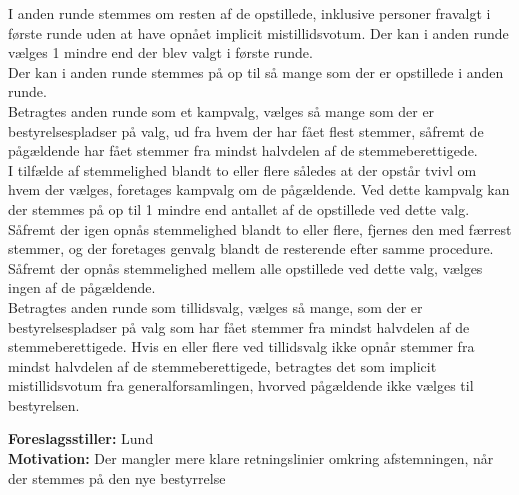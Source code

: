 \documentclass[a4paper,12pt,danish]{article}
\newcommand\who[1]{
    \textbf{Foreslagsstiller:} #1\\
}
\newcommand\why[1]{
    \textbf{Motivation:} #1\\
}
\begin{document}
{{{            I anden runde stemmes om resten af de opstillede, inklusive personer fravalgt i første runde uden at have opnået implicit mistillidsvotum. Der kan i anden runde vælges 1 mindre end der blev valgt i første runde.\\
            Der kan i anden runde stemmes på op til så mange som der er opstillede i anden runde.\\
            Betragtes anden runde som et kampvalg, vælges så mange som der er bestyrelsespladser på valg, ud fra hvem der har fået flest stemmer, såfremt de pågældende har fået stemmer fra mindst halvdelen af de stemmeberettigede.\\
            I tilfælde af stemmelighed blandt to eller flere således at der opstår tvivl om hvem der vælges, foretages kampvalg om de pågældende. Ved dette kampvalg kan der stemmes på op til 1 mindre end antallet af de opstillede ved dette valg. Såfremt der igen opnås stemmelighed blandt to eller flere, fjernes den med færrest stemmer, og der foretages genvalg blandt de resterende efter samme procedure. Såfremt der opnås stemmelighed mellem alle opstillede ved dette valg, vælges ingen af de pågældende.\\
            Betragtes anden runde som tillidsvalg, vælges så mange, som der er bestyrelsespladser på valg som har fået stemmer fra mindst halvdelen af de stemmeberettigede. Hvis en eller flere ved tillidsvalg ikke opnår stemmer fra mindst halvdelen af de stemmeberettigede, betragtes det som implicit mistillidsvotum fra generalforsamlingen, hvorved pågældende ikke vælges til bestyrelsen.
        }
        \who{Lund}
        \why{Der mangler mere klare retningslinier omkring afstemningen, når der stemmes på den nye bestyrrelse}
    }

}
\end{document}
